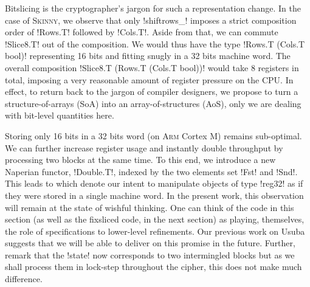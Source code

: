\documentclass[draft,english]{jflart}
\newcommand{\Skinny}{\textsc{Skinny}}
\begin{document}

Bitslicing is the cryptographer's jargon for such a representation
change. In the case of \Skinny{}, we observe that only \coqe!shiftrows_!
imposes a strict composition order of \coqe!Rows.T! followed by
\coqe!Cols.T!. Aside from that, we can commute \coqe!Slice8.T! out of the
composition. We would thus have the type \coqe!Rows.T (Cols.T bool)!
representing 16 bits and fitting snugly in a 32 bits machine word. The
overall composition \coqe!Slice8.T (Rows.T (Cols.T bool))! would take
8 registers in total, imposing a very reasonable amount of register
pressure on the CPU.
%
In effect, to return back to the jargon of compiler designers, we
propose to turn a structure-of-arrays (SoA) into an
array-of-structures (AoS), only we are dealing with bit-level
quantities here.



Storing only 16 bits in a 32 bits word (on \textsc{Arm} Cortex M)
remains sub-optimal. We can further increase register usage and
instantly double throughput by processing two blocks at the same
time. To this end, we introduce a new Naperian functor,
\coqe!Double.T!, indexed by the two elements set \coqe!Fst!  and
\coqe!Snd!. This leads to
%
%
which denote our intent to manipulate objects of type \coqe!reg32! as
if they were stored in a single machine word. In the present work,
this observation will remain at the state of wishful thinking. One can
think of the code in this section (as well as the fixsliced code, in
the next section) as playing, themselves, the role of specifications
to lower-level refinements. Our previous work on Usuba~\citep{mercadier:PhD} suggests that
we will be able to deliver on this promise in the future. Further,
remark that the \coqe!state! now corresponds to two intermingled
blocks but as we shall process them in lock-step throughout the
cipher, this does not make much difference.

\end{document}
